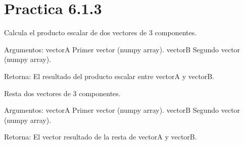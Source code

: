 \documentclass[letterpaper,10pt,spanish]{sphinxmanual}
\begin{document}
\section{Practica 6.1.3}
\label{\detokenize{pr6:module-pr6.1_3}}\label{\detokenize{pr6:practica-6-1-3}}

\begin{fulllineitems}
\label{\detokenize{pr6:pr6.1_3.productoEscalar}}
\pysigstartsignatures
{}
\pysigstopsignatures
\sphinxAtStartPar
Calcula el producto escalar de dos vectores de 3 componentes.

\sphinxAtStartPar
Argumentos:
vectorA \textendash{} Primer vector (numpy array).
vectorB \textendash{} Segundo vector (numpy array).

\sphinxAtStartPar
Retorna:
El resultado del producto escalar entre vectorA y vectorB.

\end{fulllineitems}


\begin{fulllineitems}
\label{\detokenize{pr6:pr6.1_3.resta}}
\pysigstartsignatures
{}
\pysigstopsignatures
\sphinxAtStartPar
Resta dos vectores de 3 componentes.

\sphinxAtStartPar
Argumentos:
vectorA \textendash{} Primer vector (numpy array).
vectorB \textendash{} Segundo vector (numpy array).

\sphinxAtStartPar
Retorna:
El vector resultado de la resta de vectorA y vectorB.

\end{fulllineitems}

\end{document}
